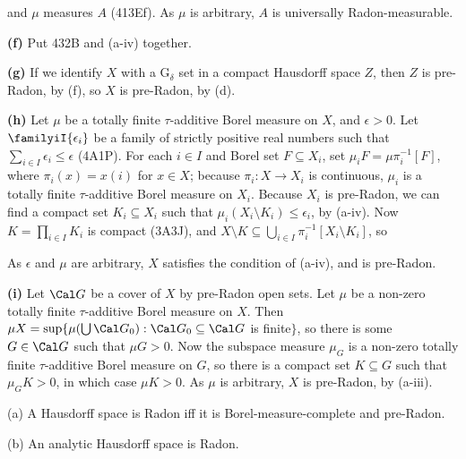 {\noindent and $\mu$ measures $A$ (413Ef).   As $\mu$ is arbitrary, $A$
is universally Radon-measurable.

\medskip

{\bf (f)} Put 432B and (a-iv) together.

\medskip

{\bf (g)} If we identify $X$ with a G$_{\delta}$ set in a compact
Hausdorff space $Z$, then $Z$ is pre-Radon, by (f), so $X$ is pre-Radon,
by (d).

\medskip

{\bf (h)} Let $\mu$ be a totally finite $\tau$-additive Borel measure on
$X$, and $\epsilon>0$.   Let $\familyiI{\epsilon_i}$ be a family of
strictly positive real numbers such that
$\sum_{i\in I}\epsilon_i\le\epsilon$ (4A1P).   For each $i\in I$ and Borel
set $F\subseteq X_i$, set $\mu_iF=\mu\pi_i^{-1}[F]$, where
$\pi_i(x)=x(i)$ for $x\in X$;  because $\pi_i:X\to X_i$ is continuous,
$\mu_i$ is a totally finite $\tau$-additive Borel measure on $X_i$.
Because $X_i$ is pre-Radon, we can find a compact set $K_i\subseteq X_i$
such that $\mu_i(X_i\setminus K_i)\le\epsilon_i$, by (a-iv).   Now
$K=\prod_{i\in I}K_i$ is compact (3A3J), and
$X\setminus K\subseteq\bigcup_{i\in I}\pi_i^{-1}[X_i\setminus K_i]$, so


As $\epsilon$ and $\mu$ are arbitrary, $X$ satisfies the condition of
(a-iv), and is pre-Radon.

\medskip

{\bf (i)} Let $\Cal G$ be a cover of $X$ by pre-Radon open sets.   Let
$\mu$ be a non-zero totally finite $\tau$-additive Borel measure on $X$.
Then $\mu X=\sup\{\mu(\bigcup\Cal G_0):\Cal G_0\subseteq\Cal G$ is
finite$\}$, so there is some $G\in\Cal G$ such that $\mu G>0$.   Now the
subspace measure $\mu_G$ is a non-zero totally finite $\tau$-additive
Borel measure on $G$, so there is a compact set $K\subseteq G$ such that
$\mu_GK>0$, in which case $\mu K>0$.   As $\mu$ is arbitrary, $X$ is
pre-Radon, by (a-iii).
}%

 (a) A Hausdorff space is Radon iff it is
Borel-measure-complete and pre-Radon.

(b) An analytic Hausdorff space is Radon.

